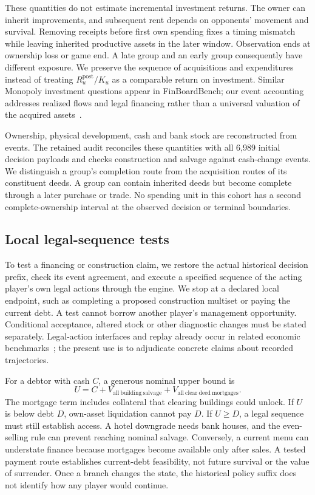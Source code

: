 These quantities do not estimate incremental investment returns. The owner can inherit improvements, and subsequent rent depends on opponents' movement and survival. Removing receipts before first own spending fixes a timing mismatch while leaving inherited productive assets in the later window. Observation ends at ownership loss or game end. A late group and an early group consequently have different exposure. We preserve the sequence of acquisitions and expenditures instead of treating $R_u^{\mathrm{post}}/K_u$ as a comparable return on investment. Similar Monopoly investment questions appear in FinBoardBench; our event accounting addresses realized flows and legal financing rather than a universal valuation of the acquired assets~\cite{hu2026finboardbench}.

Ownership, physical development, cash and bank stock are reconstructed from events. The retained audit reconciles these quantities with all 6,989 initial decision payloads and checks construction and salvage against cash-change events. We distinguish a group's completion route from the acquisition routes of its constituent deeds. A group can contain inherited deeds but become complete through a later purchase or trade. No spending unit in this cohort has a second complete-ownership interval at the observed decision or terminal boundaries.

\subsection{Local legal-sequence tests}

To test a financing or construction claim, we restore the actual historical decision prefix, check its event agreement, and execute a specified sequence of the acting player's own legal actions through the engine. We stop at a declared local endpoint, such as completing a proposed construction multiset or paying the current debt. A test cannot borrow another player's management opportunity. Conditional acceptance, altered stock or other diagnostic changes must be stated separately. Legal-action interfaces and replay already occur in related economic benchmarks~\cite{wu2026agentmonopoly,zhang2026dece}; the present use is to adjudicate concrete claims about recorded trajectories.

For a debtor with cash $C$, a generous nominal upper bound is
\begin{equation}
 U=C+V_{\mathrm{all\ building\ salvage}}
       +V_{\mathrm{all\ clear\ deed\ mortgages}}.
 \label{eq:sol-upper}
\end{equation}
The mortgage term includes collateral that clearing buildings could unlock. If $U$ is below debt $D$, own-asset liquidation cannot pay $D$. If $U\geq D$, a legal sequence must still establish access. A hotel downgrade needs bank houses, and the even-selling rule can prevent reaching nominal salvage. Conversely, a current menu can understate finance because mortgages become available only after sales. A tested payment route establishes current-debt feasibility, not future survival or the value of surrender. Once a branch changes the state, the historical policy suffix does not identify how any player would continue.

